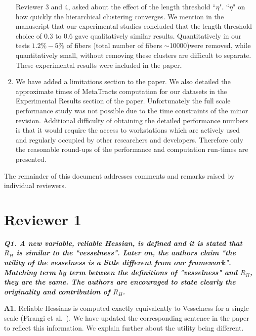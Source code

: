 \documentclass[]{article}
\begin{document}
\begin{enumerate}
{			Reviewer 3 and  4, asked  about the effect of the length threshold ``$\eta$".  ``$\eta$" on how quickly the hierarchical clustering converges. We mention in the manuscript that our experimental studies concluded that the length threshold choice of 0.3 to 0.6 gave qualitatively similar results. Quantitatively in our  tests $1.2\% - 5\%$ of fibers (total number of fibers $\sim$10000)were removed, while quantitatively small, without removing these clusters are difficult to separate. These experimental results were included in the paper.
			}
			\item{
				We have added a limitations section to the paper. We also detailed the approximate times of MetaTracts computation for our datasets in the Experimental Results section of the paper. Unfortunately the full scale performance study was not possible due to the time constraints of the minor revision. Additional difficulty of obtaining the detailed performance numbers is that it would require the access to workstations which are actively used and regularly occupied by other researchers and developers. Therefore only the reasonable round-ups of the performance and computation run-times are presented.
				}
\end{enumerate}
   
 The remainder of this document addresses comments and remarks raised by individual reviewers.

\section*{Reviewer 1}

\textbf{\textit{
Q1. A new variable, reliable Hessian, is defined and it is stated that $R_{H}$ is similar to the "vesselness".  Later on, the authors claim "the utility of the vesselness is a little different from our framework". Matching term by term between the definitions of "vesselness" and $R_{H}$, they are the same. The authors are encouraged to state clearly the originality and contribution of $R_{H}$.
}}


\textbf{A1.} Reliable Hessians is computed exactly equivalently to Vesselness for a single scale (Firangi et al.~\cite{Frangi1998}). We have  updated the corresponding sentence in the paper to reflect this information. We explain further about the utility being different.
\end{document}
